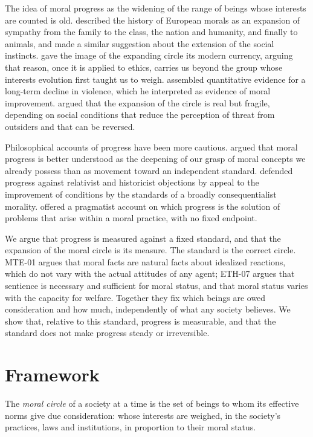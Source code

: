 \documentclass{situationist-preprint}
\begin{document}
The idea of moral progress as the widening of the range of beings whose interests are counted is old. \citet{Lecky1869} described the history of European morals as an expansion of sympathy from the family to the class, the nation and humanity, and finally to animals, and \citet{Darwin1871} made a similar suggestion about the extension of the social instincts. \citet{Singer1981} gave the image of the expanding circle its modern currency, arguing that reason, once it is applied to ethics, carries us beyond the group whose interests evolution first taught us to weigh. \citet{Pinker2011} assembled quantitative evidence for a long-term decline in violence, which he interpreted as evidence of moral improvement. \citet{BuchananPowell2018} argued that the expansion of the circle is real but fragile, depending on social conditions that reduce the perception of threat from outsiders and that can be reversed.

Philosophical accounts of progress have been more cautious. \citet{MoodyAdams1999} argued that moral progress is better understood as the deepening of our grasp of moral concepts we already possess than as movement toward an independent standard. \citet{Jamieson2002} defended progress against relativist and historicist objections by appeal to the improvement of conditions by the standards of a broadly consequentialist morality. \citet{Kitcher2021} offered a pragmatist account on which progress is the solution of problems that arise within a moral practice, with no fixed endpoint.

We argue that progress is measured against a fixed standard, and that the expansion of the moral circle is its measure. The standard is the correct circle. MTE-01 argues that moral facts are natural facts about idealized reactions, which do not vary with the actual attitudes of any agent; ETH-07 argues that sentience is necessary and sufficient for moral status, and that moral status varies with the capacity for welfare. Together they fix which beings are owed consideration and how much, independently of what any society believes. We show that, relative to this standard, progress is measurable, and that the standard does not make progress steady or irreversible.

\section{Framework}

\begin{definition}\label{d:circle}
The \emph{moral circle} of a society at a time is the set of beings to whom its effective norms give due consideration: whose interests are weighed, in the society's practices, laws and institutions, in proportion to their moral status.
\end{definition}
\end{document}
